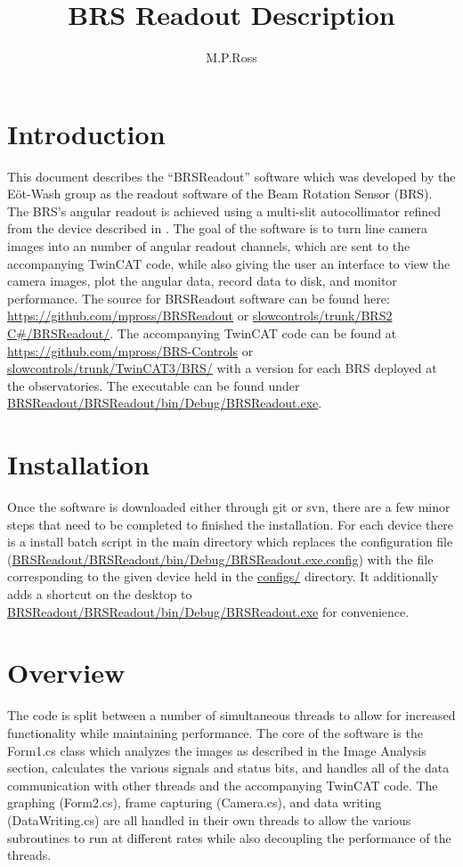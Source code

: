 \documentclass{article}
\title{BRS Readout Description}
\author{M.P.Ross}
\begin{document}
\maketitle
\section{Introduction}
This document describes the ``BRSReadout'' software which was developed by the E{\"o}t-Wash group as the readout software of the Beam Rotation Sensor (BRS). The BRS's angular readout is achieved using a multi-slit autocollimator refined from the device described in \cite{autoCol}. The goal of the software is to turn line camera images into an number of angular readout channels, which are sent to the accompanying TwinCAT code, while also giving the user an interface to view the camera images, plot the angular data, record data to disk, and monitor performance. The source for BRSReadout software can be found here: \url{https://github.com/mpross/BRSReadout} or \url{slowcontrols/trunk/BRS2 C#/BRSReadout/}. The accompanying TwinCAT code can be found at \url{https://github.com/mpross/BRS-Controls} or \url{slowcontrols/trunk/TwinCAT3/BRS/}  with a version for each BRS deployed at the observatories. The executable can be found under \url{BRSReadout/BRSReadout/bin/Debug/BRSReadout.exe}.
\section{Installation}
Once the software is downloaded either through git or svn, there are a few minor steps that need to be completed to finished the installation. For each device there is a install batch script in the main directory which replaces the configuration file (\url{BRSReadout/BRSReadout/bin/Debug/BRSReadout.exe.config}) with the file corresponding to the given device held in the \url{configs/} directory. It additionally adds a shortcut on the desktop to \url{BRSReadout/BRSReadout/bin/Debug/BRSReadout.exe} for convenience.
\section{Overview}
The code is split between a number of simultaneous threads to allow for increased functionality while maintaining performance. The core of the software is the Form1.cs class which analyzes the images as described in the Image Analysis section, calculates the various signals and status bits, and handles all of the data communication with other threads and the accompanying TwinCAT code. The graphing (Form2.cs), frame capturing (Camera.cs), and data writing (DataWriting.cs) are all handled in their own threads to allow the various subroutines to run at different rates while also decoupling the performance of the threads.
\end{document}

